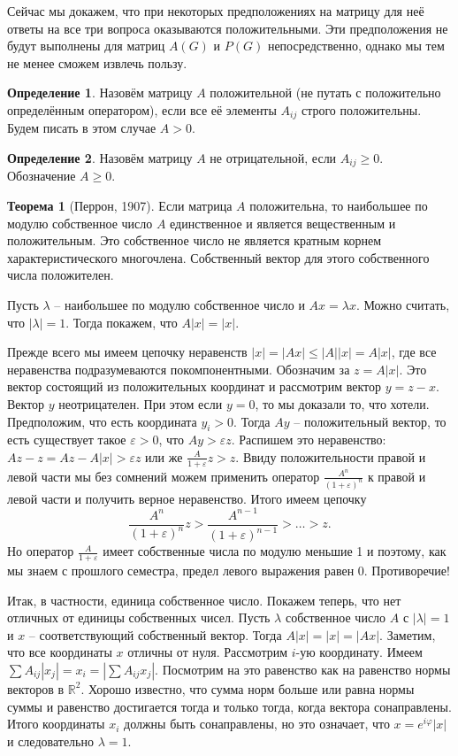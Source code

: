 \documentclass[10pt,a4paper,oneside]{book}
\theoremstyle{definition}
\newtheorem*{defn}{{\color{yellow!20!red} Определение}}
\newtheorem{thm}{{\color{red!40!black} Теорема}}
\newcommand{\mb}[1]{\mathbb{#1}}
\def\ffi{\varphi}
\def\eps{\varepsilon}
\def\thrm{\begin{thm}}
\def\ethrm{\end{thm}}
\def\dfn{\begin{defn}}
\def\edfn{\end{defn}}
\begin{document}
Сейчас мы докажем, что при некоторых предположениях на матрицу для неё ответы на все три вопроса оказываются положительными. Эти предположения не будут выполнены для матриц $A(G)$ и  $P(G)$ непосредственно, однако мы тем не менее сможем извлечь пользу.

\dfn Назовём матрицу $A$ положительной (не путать с положительно определённым оператором), если все её элементы $A_{ij}$ строго положительны. Будем писать в этом случае $A>0$.
\edfn

\dfn Назовём матрицу  $A$ не отрицательной, если $A_{ij}\geq 0$. Обозначение $A \geq 0$.
\edfn

\thrm[Перрон, 1907] Если матрица $A$ положительна, то наибольшее по модулю собственное число $A$ единственное и является вещественным и положительным. Это собственное число не является кратным корнем характеристического многочлена. Собственный вектор для этого собственного числа положителен.
\ethrm
\proof Пусть $\lambda$ -- наибольшее по модулю собственное число и $Ax=\lambda x$. Можно считать, что $|\lambda|=1$. Тогда покажем, что $A|x|=|x|$.

Прежде всего мы имеем цепочку неравенств $|x|=|Ax|\leq |A||x|=A|x|$, где все неравенства подразумеваются покомпонентными. Обозначим за $z=A|x|$. Это вектор состоящий из положительных координат и рассмотрим вектор $y=z-x$. Вектор $y$ неотрицателен. При этом если $y=0$, то мы доказали то, что хотели. Предположим, что есть координата $y_i>0$. Тогда $Ay$ -- положительный вектор, то есть существует такое $\eps>0$, что $Ay>\eps z$. Распишем это неравенство: $Az - z= Az-A|x|> \eps z$ или же $\frac{A}{1+\eps}z>z$. Ввиду положительности правой и левой части мы без сомнений можем применить оператор $\frac{A^n}{(1+\eps)^n}$ к правой и левой части и получить верное неравенство. Итого имеем цепочку 
$$\frac{A^n}{(1+\eps)^n}z>\frac{A^{n-1}}{(1+\eps)^{n-1}}> \dots > z.$$
Но оператор $\frac{A}{1+\eps}$ имеет собственные числа по модулю меньшие 1 и поэтому, как мы знаем с прошлого семестра, предел левого выражения равен 0. Противоречие!

Итак, в частности, единица собственное число. Покажем теперь, что нет отличных от единицы собственных чисел. Пусть $\lambda$ собственное число $A$ с $|\lambda|=1$ и $x$ -- соответствующий собственный вектор. Тогда $A|x|=|x|=|Ax|$. Заметим, что все координаты $x$ отличны от нуля. Рассмотрим $i$-ую координату. Имеем $\sum A_{ij}|x_j|=x_i=|\sum A_{ij}x_j|$. Посмотрим на это равенство как на равенство нормы векторов в $\mb R^2$. Хорошо известно, что сумма норм больше или равна нормы суммы и равенство достигается тогда и только тогда, когда вектора сонаправлены. Итого координаты $x_i$ должны быть сонаправлены, но это означает, что $x=e^{i\ffi} |x|$ и следовательно $\lambda=1$. 
\end{document}
